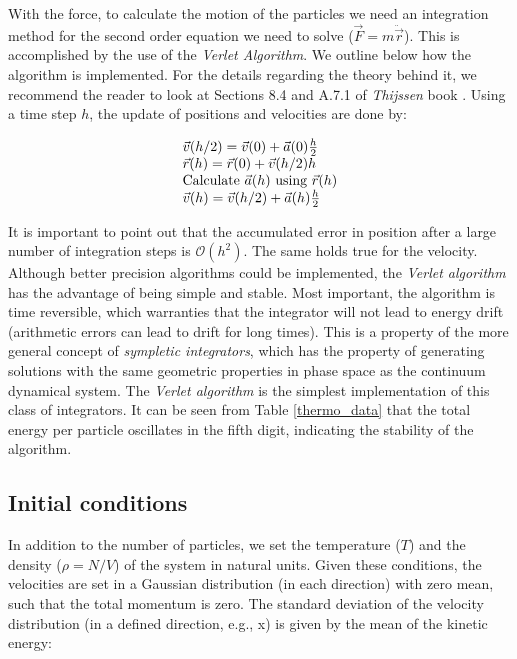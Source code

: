 \documentclass[aps,prl,reprint,groupedaddress]{revtex4-1}
\begin{document}
With the force, to calculate the motion of the particles we need an integration method for the second order equation we need to solve ($\vec{F} = m\ddot{\vec{r}}$). This is accomplished by the use of the \textit{Verlet Algorithm}. We outline below how the algorithm is implemented. For the details regarding the theory behind it, we recommend the reader to look at Sections 8.4 and A.7.1 of \textit{Thijssen} book \cite{ICCPBook}. Using a time step $h$, the update of positions and velocities are done by:

\begin{equation}
\begin{array}{l l}

\vec{v}(h/2) = \vec{v}(0) + \vec{a}(0)\frac{h}{2} \\
\vec{r}(h) = \vec{r}(0) + \vec{v}(h/2)h \\
\text{Calculate $\vec{a}(h)$ using $\vec{r}(h)$} \\
\vec{v}(h) = \vec{v}(h/2) + \vec{a}(h)\frac{h}{2}

\end{array}
\end{equation}

It is important to point out that the accumulated error in position after a large number of integration steps is $\mathcal{O}(h^2)$. The same holds true for the velocity. Although better precision algorithms could be implemented, the \textit{Verlet algorithm} has the advantage of being simple and stable. Most important, the algorithm is time reversible, which warranties that the integrator will not lead to energy drift (arithmetic errors can lead to drift for long times). This is a property of the more general concept of \textit{sympletic integrators}, which has the property of generating solutions with the same geometric properties in phase space as the continuum dynamical system. The \textit{Verlet algorithm} is the simplest implementation of this class of integrators. It can be seen from Table \ref{thermo_data} that the total energy per particle oscillates in the fifth digit, indicating the stability of the algorithm.

\subsection{Initial conditions}

In addition to the number of particles, we set the temperature ($T$) and the density ($\rho = N/V$) of the system in natural units. Given these conditions, the velocities are set in a Gaussian distribution (in each direction) with zero mean, such that the total momentum is zero. The standard deviation of the velocity distribution (in a defined direction, e.g., x) is given by the mean of the kinetic energy:
\end{document}
